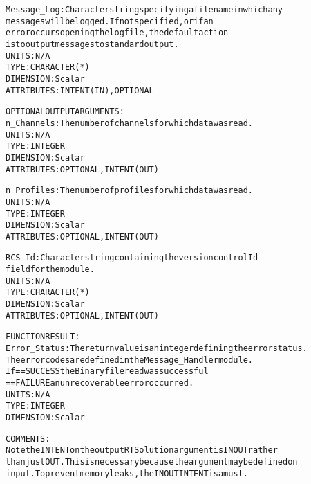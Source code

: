 \begin{alltt}
        Message_Log:  Character string specifying a filename in which any
                      messages will be logged. If not specified, or if an
                      error occurs opening the log file, the default action
                      is to output messages to standard output.
                      UNITS:      N/A
                      TYPE:       CHARACTER(*)
                      DIMENSION:  Scalar
                      ATTRIBUTES: INTENT(IN), OPTIONAL
 
  OPTIONAL OUTPUT ARGUMENTS:
        n_Channels:   The number of channels for which data was read.
                      UNITS:      N/A
                      TYPE:       INTEGER
                      DIMENSION:  Scalar
                      ATTRIBUTES: OPTIONAL, INTENT(OUT)
 
        n_Profiles:   The number of profiles for which data was read.
                      UNITS:      N/A
                      TYPE:       INTEGER
                      DIMENSION:  Scalar
                      ATTRIBUTES: OPTIONAL, INTENT(OUT)
 
        RCS_Id:       Character string containing the version control Id
                      field for the module.
                      UNITS:      N/A
                      TYPE:       CHARACTER(*)
                      DIMENSION:  Scalar
                      ATTRIBUTES: OPTIONAL, INTENT(OUT)
 
  FUNCTION RESULT:
        Error_Status: The return value is an integer defining the error status.
                      The error codes are defined in the Message_Handler module.
                      If == SUCCESS the Binary file read was successful
                         == FAILURE an unrecoverable error occurred.
                      UNITS:      N/A
                      TYPE:       INTEGER
                      DIMENSION:  Scalar
 
  COMMENTS:
        Note the INTENT on the output RTSolution argument is IN OUT rather
        than just OUT. This is necessary because the argument may be defined on
        input. To prevent memory leaks, the IN OUT INTENT is a must.
 
  \end{alltt}
